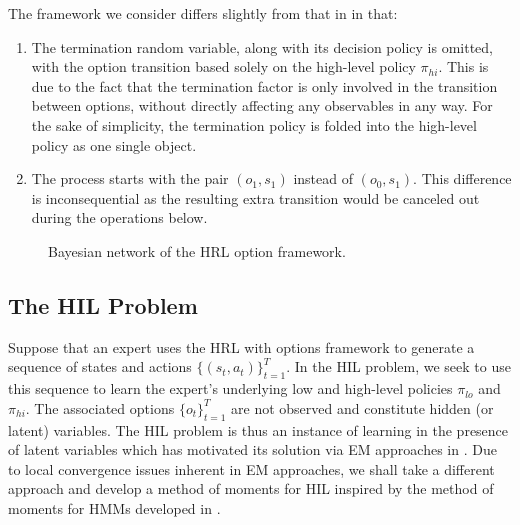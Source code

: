 \begin{remark}
The framework we consider differs slightly from that in \cite{SUTTON1999181} in that:
\begin{enumerate}
    \item The termination random variable, along with its decision policy is omitted, with the option transition based solely on the high-level policy $\pi_{hi}$. This is due to the fact that the termination factor is only involved in the transition between options, without directly affecting any observables in any way. For the sake of simplicity, the termination policy is folded into the high-level policy as one single object.
    \item The process starts with the pair $(o_1, s_1)$ instead of $(o_0, s_1)$. This difference is inconsequential as the resulting extra transition would be canceled out during the operations below.
\end{enumerate}
\end{remark}
\begin{figure}
    \newcommand{\numnodes}{4}
    \centering
    \caption{Bayesian network of the HRL option framework.}
    \label{fig:Bayes_net}
\end{figure}

\subsection{The HIL Problem}

Suppose that an expert uses the HRL with options framework to generate a sequence of states and actions $\{(s_t,a_t)\}_{t = 1}^T$.
In the HIL problem, we seek to use this sequence to learn the expert's underlying low and high-level policies $\pi_{lo}$ and $\pi_{hi}$.
The associated options $\{o_t\}_{t = 1}^T$ are not observed and constitute hidden (or latent) variables.
The HIL problem is thus an instance of learning in the presence of latent variables which has motivated its solution via EM approaches in \citep{Daniel2016,zhiyu20,Giammarino_2021}.
Due to local convergence issues inherent in EM approaches, we shall take a different approach and develop a method of moments for HIL inspired by the method of moments for HMMs developed in \citep{hsu08}.

